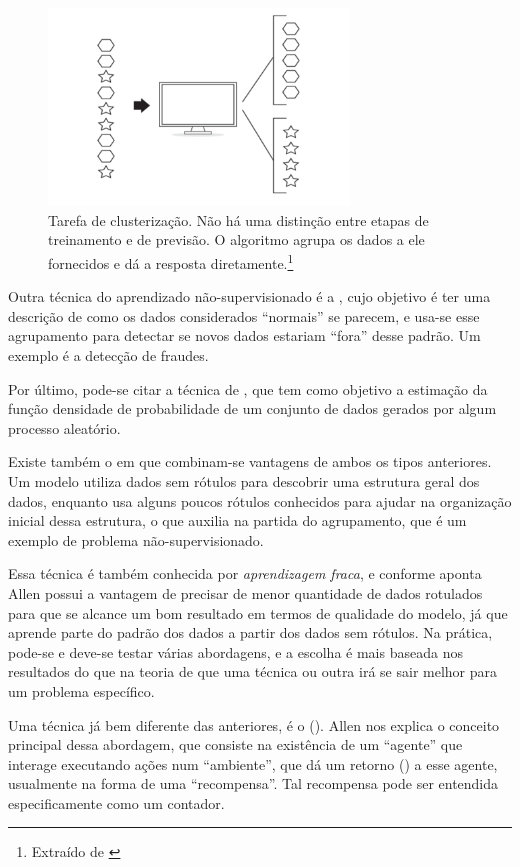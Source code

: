 \begin{figure}[htb]
\centering
\includegraphics[width=8cm]{figuras/clustering}
\caption{Tarefa de clusterização. Não há uma distinção entre etapas de treinamento e de previsão. O algoritmo agrupa os dados a ele fornecidos e dá a resposta diretamente.\footnote{Extraído de \citep{allen}}}
\label{fig:clustering}
\end{figure}

Outra técnica do aprendizado não-supervisionado é a , cujo objetivo é ter uma descrição de como os dados considerados ``normais'' se parecem, e usa-se esse agrupamento para detectar se novos dados estariam ``fora'' desse padrão. Um exemplo é a detecção de fraudes.

Por último, pode-se citar a técnica de , que tem como objetivo a estimação da função densidade de probabilidade de um conjunto de dados gerados por algum processo aleatório.

Existe também o  em que combinam-se vantagens de ambos os tipos anteriores. Um modelo utiliza dados sem rótulos para descobrir uma estrutura geral dos dados, enquanto usa alguns poucos rótulos conhecidos para ajudar na organização inicial dessa estrutura, o que auxilia na partida do agrupamento, que é um exemplo de problema não-supervisionado.

Essa técnica é também conhecida por \emph{aprendizagem fraca}, e conforme aponta Allen \citep{allen} possui a vantagem de precisar de menor quantidade de dados rotulados para que se alcance um bom resultado em termos de qualidade do modelo, já que aprende parte do padrão dos dados a partir dos dados sem rótulos. Na prática, pode-se e deve-se testar várias abordagens, e a escolha é mais baseada nos resultados do que na teoria de que uma técnica ou outra irá se sair melhor para um problema específico.

Uma técnica já bem diferente das anteriores, é o  (). Allen \citep{allen} nos explica o conceito principal dessa abordagem, que consiste na existência de um ``agente'' que interage executando ações num ``ambiente'', que dá um retorno () a esse agente, usualmente na forma de uma ``recompensa''. Tal recompensa pode ser entendida especificamente como um contador. 

